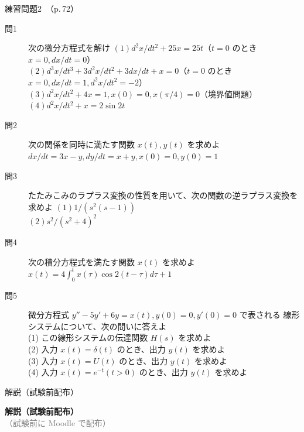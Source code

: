 \documentclass[aspectratio=43,professionalfonts,handout]{beamer}
\begin{document}
\begin{frame}{練習問題2　（p.\,72）}
  \begin{block}{}
  \begin{description}
    \item[問1] 次の微分方程式を解け
    $(1) d^{2}x/dt^{2} + 25x = 25t$（$t=0$ のとき $x=0, dx/dt=0$）\\
    $(2) d^{3}x/dt^{3} + 3d^{2}x/dt^{2} + 3dx/dt + x = 0$（$t=0$ のとき $x=0, dx/dt=1, d^{2}x/dt^{2}=-2$）\\
    $(3) d^{2}x/dt^{2} + 4x = 1,  x(0) = 0,  x(\pi/4) = 0$（境界値問題）\\
    $(4) d^{2}x/dt^{2} + x = 2\sin 2t$\\
    \item[問2] 次の関係を同時に満たす関数 $x(t), y(t)$ を求めよ
    $dx/dt = 3x - y,  dy/dt = x + y,  x(0) = 0,  y(0) = 1$\\
    \item[問3] たたみこみのラプラス変換の性質を用いて、次の関数の逆ラプラス変換を求めよ
    $(1) 1/(s^{2}(s-1))$\\
    $(2) s^{2}/(s^{2}+4)^{2}$\\
    \item[問4] 次の積分方程式を満たす関数 $x(t)$ を求めよ
    $x(t) = 4\int_{0}^t x(\tau) \cos 2(t-\tau) d\tau + 1$\\
    \item[問5] 微分方程式 $y'' - 5y' + 6y = x(t), y(0) = 0, y'(0) = 0$ で表される
    線形システムについて、次の問いに答えよ\\
    (1) この線形システムの伝達関数 $H(s)$ を求めよ\\
    (2) 入力 $x(t) = \delta(t)$ のとき、出力 $y(t)$ を求めよ\\
    (3) 入力 $x(t) = U(t)$ のとき、出力 $y(t)$ を求めよ\\
    (4) 入力 $x(t) = e^{-t} (t>0)$ のとき、出力 $y(t)$ を求めよ\\
  \end{description}
  \end{block}
\end{frame}

\begin{frame}{解説（試験前配布）}
  \vfill
  \begin{center}
  {\LARGE\bfseries\color{structure.fg} 解説（試験前配布）}\\[1em]
  {\normalsize\textcolor{gray}{（試験前に Moodle で配布）}}
  \end{center}
  \vfill
\end{frame}
\end{document}
